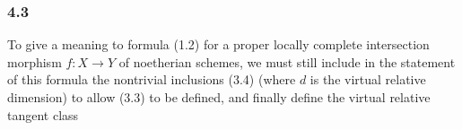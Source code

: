 \subsubsection*{4.3}
To give a meaning to formula (1.2) for a proper locally complete intersection morphism $f:X\to Y$ of noetherian schemes, we must still include in the statement of this formula the nontrivial inclusions (3.4) (where $d$ is the virtual relative dimension) to allow (3.3) to be defined, and finally define the virtual relative tangent class

